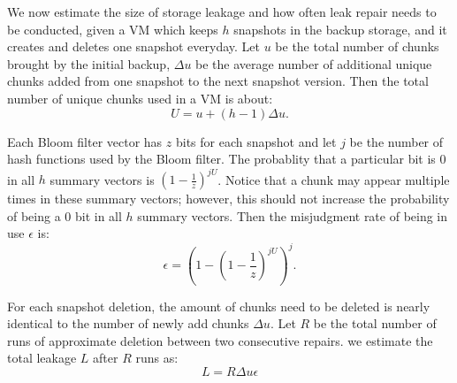 
%



We now estimate the size of storage leakage and how often leak repair needs to be conducted,
given  a VM which keeps $h$ snapshots in the backup storage, and it creates and deletes one snapshot
everyday. Let $u$ be the total number of chunks brought by the initial backup, $\Delta u$ be the average
number of additional unique chunks added from one snapshot to the next snapshot version. Then the total number of unique
chunks used in a VM is about:
\[
U = u + (h-1)\Delta u.
\]

Each Bloom filter vector has  $z$ bits for each snapshot and let $j$ be the number of hash functions used by the
Bloom filter. The probablity that a particular bit is 0  in all $h$ summary vectors is  
$(1- \frac{1}{z}) ^{j U}$. Notice that a chunk may appear multiple times in these summary vectors; however, this should not 
increase the probability of being a 0 bit in all $h$ summary vectors.
Then the misjudgment rate of being in use $\epsilon$ is: 
\begin{equation}
\label{eq:falserate}
\epsilon = (1-(1-\frac{1}{z})^{jU})^j.
\end{equation}


For each snapshot deletion, the amount of chunks need to be deleted is nearly identical to the number of
newly add chunks $\Delta u$. 
Let $R$ be the total number of runs of approximate deletion between two consecutive 
repairs. we estimate  the total leakage $L$ after $R$ runs as:
\[
L = R \Delta u \epsilon
\]

